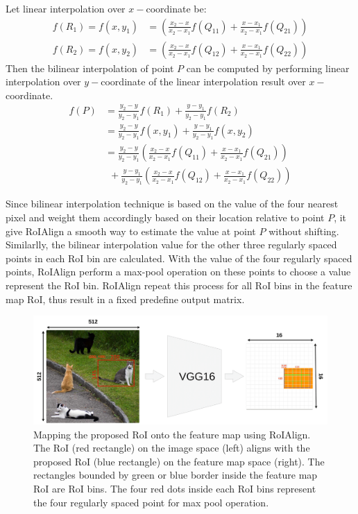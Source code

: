 \relax
{}\relax
\noindent Let linear interpolation over $x-$coordinate be:
\begin{align*}
    f(R_1) = f(x, y_1) &= \left( \frac{x_2-x}{x_2-x_1}f(Q_{11}) + \frac{x-x_1}{x_2-x_1}f(Q_{21}) \right) \\
    f(R_2) = f(x, y_2) &= \left( \frac{x_2-x}{x_2-x_1}f(Q_{12}) + \frac{x-x_1}{x_2-x_1}f(Q_{22}) \right)
\end{align*}
\noindent Then the bilinear interpolation of point $P$ can be computed by performing linear interpolation over $y-$coordinate of the linear interpolation result over $x-$coordinate. 
\begin{align}
    f(P) &= \frac{y_2-y}{y_2-y_1} f(R_1) + \frac{y-y_1}{y_2-y_1} f(R_2) \nonumber \\
    &= \frac{y_2-y}{y_2-y_1} f(x, y_1) + \frac{y-y_1}{y_2-y_1} f(x, y_2) \nonumber \\
    &= \frac{y_2-y}{y_2-y_1} \left( \frac{x_2-x}{x_2-x_1}f(Q_{11}) + \frac{x-x_1}{x_2-x_1}f(Q_{21}) \right) \nonumber \\
    &\ \ + \frac{y-y_1}{y_2-y_1} \left( \frac{x_2-x}{x_2-x_1}f(Q_{12}) + \frac{x-x_1}{x_2-x_1}f(Q_{22}) \right) \label{eq:binlinear_interpolation}
\end{align}
\relax
{}\relax

\noindent Since bilinear interpolation technique is based on the value of the four nearest pixel and weight them accordingly based on their location relative to point $P$, it give RoIAlign a smooth way to estimate the value at point $P$ without shifting. Similarlly, the bilinear interpolation value for the other three regularly spaced points in each RoI bin are calculated. With the value of the four regularly spaced points, RoIAlign perform a max-pool operation on these points to choose a value represent the RoI bin. RoIAlign repeat this process for all RoI bins in the feature map RoI, thus result in a fixed predefine output matrix.

\begin{figure}[!ht]
    \centering
    \includegraphics[width=6in]{figures/roi_align_ex.png}
    \caption{Mapping the proposed RoI onto the feature map using RoIAlign. The RoI (red rectangle) on the image space (left) aligns with the proposed RoI (blue rectangle) on the feature map space (right). The rectangles bounded by green or blue border inside the feature map RoI are RoI bins. The four red dots inside each RoI bins represent the four regularly spaced point for max pool operation. \cite{roi_pooling_problem}}
    \label{fig:roi_align_ex}
\end{figure}

